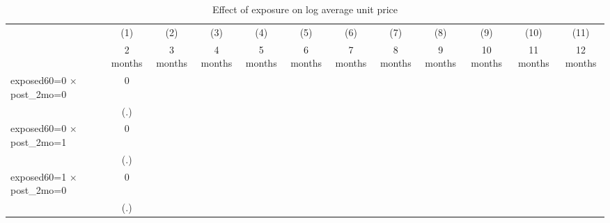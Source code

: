 \begin{table}[htbp]\centering
\def\sym#1{\ifmmode^{#1}\else\(^{#1}\)\fi}
\caption{Effect of exposure on log average unit price}
\begin{tabular}{l*{11}{c}}
\toprule
                    &\multicolumn{1}{c}{(1)}&\multicolumn{1}{c}{(2)}&\multicolumn{1}{c}{(3)}&\multicolumn{1}{c}{(4)}&\multicolumn{1}{c}{(5)}&\multicolumn{1}{c}{(6)}&\multicolumn{1}{c}{(7)}&\multicolumn{1}{c}{(8)}&\multicolumn{1}{c}{(9)}&\multicolumn{1}{c}{(10)}&\multicolumn{1}{c}{(11)}\\
                    &\multicolumn{1}{c}{2 months}&\multicolumn{1}{c}{3 months}&\multicolumn{1}{c}{4 months}&\multicolumn{1}{c}{5 months}&\multicolumn{1}{c}{6 months}&\multicolumn{1}{c}{7 months}&\multicolumn{1}{c}{8 months}&\multicolumn{1}{c}{9 months}&\multicolumn{1}{c}{10 months}&\multicolumn{1}{c}{11 months}&\multicolumn{1}{c}{12 months}\\
\midrule
exposed60=0 $\times$ post\_2mo=0&           0         &                     &                     &                     &                     &                     &                     &                     &                     &                     &                     \\
                    &         (.)         &                     &                     &                     &                     &                     &                     &                     &                     &                     &                     \\
\addlinespace
exposed60=0 $\times$ post\_2mo=1&           0         &                     &                     &                     &                     &                     &                     &                     &                     &                     &                     \\
                    &         (.)         &                     &                     &                     &                     &                     &                     &                     &                     &                     &                     \\
\addlinespace
exposed60=1 $\times$ post\_2mo=0&           0         &                     &                     &                     &                     &                     &                     &                     &                     &                     &                     \\
                    &         (.)         &                     &                     &                     &                     &                     &                     &                     &                     &                     &                     \\

\end{tabular}
\end{table}

